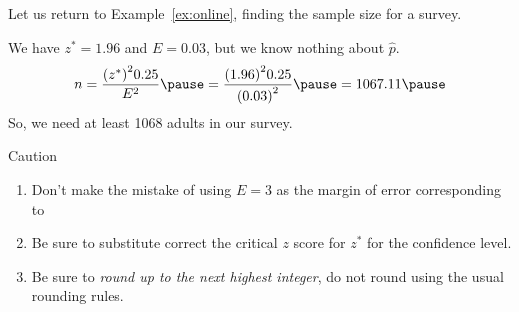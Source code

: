 \documentclass{beamer}
\begin{document}
\begin{frame}
  \begin{example}
    Let us return to Example~\ref{ex:online}, finding the sample size for a survey.\pause

    \vspace{1mm}
    We have $z^{*}=1.96$ and $E=0.03$, but we know nothing about $\hat{p}$.\pause
    \begin{equation*}
      n=\dfrac{ {(z^{*})}^2 0.25 }{E^2} \pause
      =\dfrac{ {(1.96)}^2 0.25 }{{(0.03)}^2}\pause
      =1067.11 \pause
    \end{equation*}
    So, we need at least 1068 adults in our survey.\pause
  \end{example}
  \begin{block}{Caution}
    \begin{enumerate}
    \item Don't make the mistake of using $E=3$ as the margin of error corresponding to \pause
    \item Be sure to substitute correct the critical $z$ score for $z^{*}$ for the confidence level.\pause
    \item Be sure to \emph{round up to the next highest integer}, do not round using the usual rounding rules.
    \end{enumerate}
  \end{block}
\end{frame}
\end{document}
